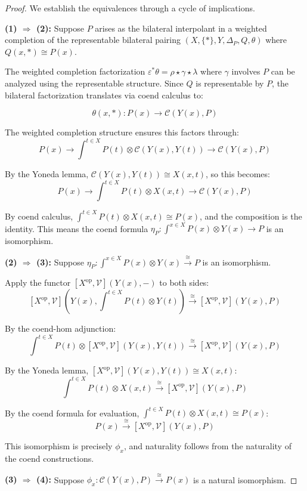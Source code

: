 \documentclass[11pt]{article}
\theoremstyle{plain}
\theoremstyle{definition}
\theoremstyle{remark}
\newcommand{\V}{\mathcal{V}}
\newcommand{\C}{\mathcal{C}}
\newcommand{\op}{\mathrm{op}}
\begin{document}
\begin{proof}
We establish the equivalences through a cycle of implications.

\textbf{(1) $\Rightarrow$ (2):} 
Suppose $P$ arises as the bilateral interpolant in a weighted completion of the representable bilateral pairing $(X, \{\ast\}, Y, \Delta_P, Q, \theta)$ where $Q(x, \ast) \cong P(x)$.

The weighted completion factorization $\varepsilon^* \theta = \rho \star \gamma \star \lambda$ where $\gamma$ involves $P$ can be analyzed using the representable structure. Since $Q$ is representable by $P$, the bilateral factorization translates via coend calculus to:

$$\theta(x, \ast) : P(x) \to \C(Y(x), P)$$

The weighted completion structure ensures this factors through:
$$P(x) \to \int^{t \in X} P(t) \otimes \C(Y(x), Y(t)) \to \C(Y(x), P)$$

By the Yoneda lemma, $\C(Y(x), Y(t)) \cong X(x, t)$, so this becomes:
$$P(x) \to \int^{t \in X} P(t) \otimes X(x, t) \to \C(Y(x), P)$$

By coend calculus, $\int^{t \in X} P(t) \otimes X(x, t) \cong P(x)$, and the composition is the identity. This means the coend formula $\eta_P : \int^{x \in X} P(x) \otimes Y(x) \to P$ is an isomorphism.

\textbf{(2) $\Rightarrow$ (3):}
Suppose $\eta_P : \int^{x \in X} P(x) \otimes Y(x) \xrightarrow{\cong} P$ is an isomorphism.

Apply the functor $[X^{\op}, \V](Y(x), -)$ to both sides:
$$[X^{\op}, \V]\left(Y(x), \int^{t \in X} P(t) \otimes Y(t)\right) \xrightarrow{\cong} [X^{\op}, \V](Y(x), P)$$

By the coend-hom adjunction:
$$\int^{t \in X} P(t) \otimes [X^{\op}, \V](Y(x), Y(t)) \xrightarrow{\cong} [X^{\op}, \V](Y(x), P)$$

By the Yoneda lemma, $[X^{\op}, \V](Y(x), Y(t)) \cong X(x, t)$:
$$\int^{t \in X} P(t) \otimes X(x, t) \xrightarrow{\cong} [X^{\op}, \V](Y(x), P)$$

By the coend formula for evaluation, $\int^{t \in X} P(t) \otimes X(x, t) \cong P(x)$:
$$P(x) \xrightarrow{\cong} [X^{\op}, \V](Y(x), P)$$

This isomorphism is precisely $\phi_x$, and naturality follows from the naturality of the coend constructions.

\textbf{(3) $\Rightarrow$ (4):}
Suppose $\phi_x : \C(Y(x), P) \xrightarrow{\cong} P(x)$ is a natural isomorphism.


\end{proof}
\end{document}
